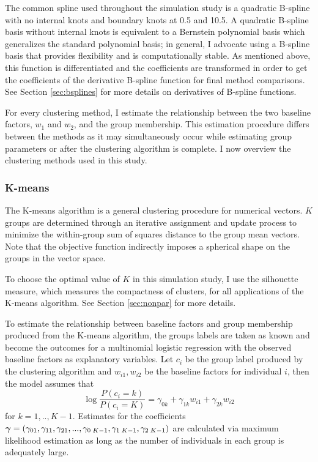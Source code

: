 The common spline used throughout the simulation study is a quadratic B-spline with no internal knots and boundary knots at 0.5 and 10.5. A quadratic B-spline basis without internal knots is equivalent to a Bernstein polynomial basis \cite{lorentz1953} which generalizes the standard polynomial basis; in general, I advocate using a B-spline basis that provides flexibility and is computationally stable.  As mentioned above, this function is differentiated and the coefficients are transformed in order to get the coefficients of the derivative B-spline function for final method comparisons. See Section \ref{sec:bsplines} for more details on derivatives of B-spline functions.

For every clustering method, I estimate the relationship between the two baseline factors, $w_{1}$ and $w_{2}$, and the group membership. This estimation procedure differs between the methods as it may simultaneously occur while estimating group parameters or after the clustering algorithm is complete. I now overview the clustering methods used in this study.

\subsubsection{K-means}
The K-means algorithm is a general clustering procedure for numerical vectors. $K$ groups are determined through an iterative assignment and update process to minimize the within-group sum of squares distance to the group mean vectors. Note that the objective function indirectly imposes a spherical shape on the groups in the vector space.

To choose the optimal value of $K$ in this simulation study, I use the silhouette measure, which measures the compactness of clusters, for all applications of the K-means algorithm. See Section \ref{sec:nonpar} for more details. 

To estimate the relationship between baseline factors and group membership produced from the K-means algorithm, the groups labels are taken as known and become the outcomes for a multinomial logistic regression with the observed baseline factors as explanatory variables. Let $c_{i}$ be the group label produced by the clustering algorithm and $w_{i1}, w_{i2}$ be the baseline factors for individual $i$, then the model assumes that
$$\log\frac{P(c_{i}=k)}{P(c_{i}=K)} = \gamma_{0k}+\gamma_{1k}w_{i1}+\gamma_{2k}w_{i2}$$
for $k=1,..,K-1$. Estimates for the coefficients $\boldsymbol\gamma = (\gamma_{01},\gamma_{11},\gamma_{21},...,\gamma_{0\;K-1},\gamma_{1\;K-1},\gamma_{2\;K-1})$ are calculated via maximum likelihood estimation as long as the number of individuals in each group is adequately large.

